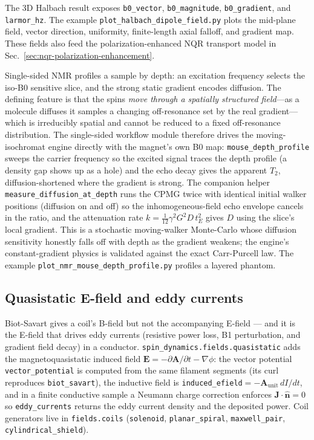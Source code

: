 \documentclass[11pt,oneside]{report}
\newcommand{\code}[1]{\texttt{#1}}
\begin{document}
The 3D Halbach result exposes \code{b0\_vector}, \code{b0\_magnitude},
\code{b0\_gradient}, and \code{larmor\_hz}. The example
\code{plot\_halbach\_dipole\_field.py} plots the mid-plane field, vector
direction, uniformity, finite-length axial falloff, and gradient map. These
fields also feed the polarization-enhanced NQR transport model in
Sec.~\ref{sec:nqr-polarization-enhancement}.

Single-sided NMR profiles a sample by depth: an excitation frequency selects the
iso-B0 sensitive slice, and the strong static gradient encodes diffusion. The
defining feature is that the spins \emph{move through a spatially structured
field}---as a molecule diffuses it samples a changing off-resonance set by the
real gradient---which is irreducibly spatial and cannot be reduced to a fixed
off-resonance distribution. The single-sided workflow module therefore drives
the moving-isochromat engine directly with the magnet's own B0 map:
\code{mouse\_depth\_profile} sweeps the carrier frequency so the excited signal
traces the depth profile (a density gap shows up as a hole) and the echo decay
gives the apparent \(T_2\), diffusion-shortened where the gradient is strong.
The companion helper \code{measure\_diffusion\_\allowbreak at\_depth} runs the
CPMG twice with identical initial walker positions (diffusion on and off) so the
inhomogeneous-field echo envelope cancels in the ratio, and the attenuation rate
\(k=\tfrac{1}{12}\gamma^2 G^2 D\,t_E^2\) gives \(D\) using the slice's local
gradient. This is a stochastic moving-walker Monte-Carlo whose diffusion
sensitivity honestly falls off with depth as the gradient weakens; the engine's
constant-gradient physics is validated against the exact Carr-Purcell law. The
example \code{plot\_nmr\_mouse\_depth\_profile.py} profiles a layered phantom.

\subsection{Quasistatic E-field and eddy currents}
\label{sec:fields-quasistatic}

Biot-Savart gives a coil's B-field but not the accompanying E-field --- and it is
the E-field that drives eddy currents (resistive power loss, B1 perturbation, and
gradient field decay) in a conductor. \code{spin\_dynamics.fields.quasistatic}
adds the magnetoquasistatic induced field \(\mathbf{E}=-\partial\mathbf{A}/
\partial t-\nabla\phi\): the vector potential \code{vector\_potential} is computed
from the same filament segments (its curl reproduces \code{biot\_savart}), the
inductive field is \code{induced\_efield}\(=-\mathbf{A}_{\text{unit}}\,dI/dt\), and
in a finite conductive sample a Neumann charge correction enforces
\(\mathbf{J}\cdot\hat{\mathbf n}=0\) so \code{eddy\_currents} returns the eddy
current density and the deposited power. Coil generators live in
\code{fields.coils} (\code{solenoid}, \code{planar\_spiral}, \code{maxwell\_pair},
\code{cylindrical\_shield}).
\end{document}
